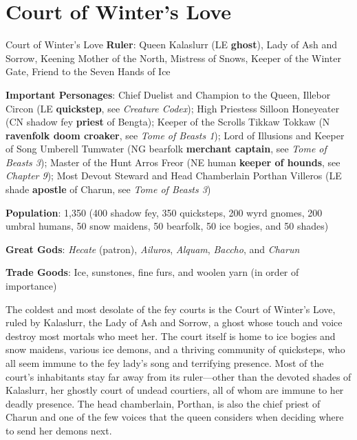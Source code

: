 \documentclass[10pt,a4paper,twoside,bg=print,twocolumn,openany,nodeprecatedcode]{dndbook}
\begin{document}
\section{Court of Winter's Love}
\begin{DndSidebar}[float=!b]{Court of Winter's Love}
\textbf{Ruler}: Queen Kalaslurr (LE \textbf{ghost}), Lady of Ash and Sorrow, Keening Mother of the North, Mistress of Snows, Keeper of the Winter Gate, Friend to the Seven Hands of Ice



\textbf{Important Personages}: Chief Duelist and Champion to the Queen, Illebor Circon (LE \textbf{quickstep}, see \textit{Creature Codex}); High Priestess Silloon Honeyeater (CN shadow fey \textbf{priest} of Bengta); Keeper of the Scrolls Tikkaw Tokkaw (N \textbf{ravenfolk doom croaker}, see \textit{Tome of Beasts 1}); Lord of Illusions and Keeper of Song Umberell Tumwater (NG bearfolk \textbf{merchant captain}, see \textit{Tome of Beasts 3}); Master of the Hunt Arros Freor (NE human \textbf{keeper of hounds}, see \textit{Chapter 9}); Most Devout Steward and Head Chamberlain Porthan Villeros (LE shade \textbf{apostle} of Charun, see \textit{Tome of Beasts 3})



\textbf{Population}: 1,350 (400 shadow fey, 350 quicksteps, 200 wyrd gnomes, 200 umbral humans, 50 snow maidens, 50 bearfolk, 50 ice bogies, and 50 shades)



\textbf{Great Gods}: \textit{Hecate} (patron), \textit{Ailuros}, \textit{Alquam}, \textit{Baccho}, and \textit{Charun}



\textbf{Trade Goods}: Ice, sunstones, fine furs, and woolen yarn (in order of importance)





\end{DndSidebar}

The coldest and most desolate of the fey courts is the Court of Winter's Love, ruled by Kalaslurr, the Lady of Ash and Sorrow, a ghost whose touch and voice destroy most mortals who meet her. The court itself is home to ice bogies and snow maidens, various ice demons, and a thriving community of quicksteps, who all seem immune to the fey lady's song and terrifying presence. Most of the court's inhabitants stay far away from its ruler—other than the devoted shades of Kalaslurr, her ghostly court of undead courtiers, all of whom are immune to her deadly presence. The head chamberlain, Porthan, is also the chief priest of Charun and one of the few voices that the queen considers when deciding where to send her demons next.
\end{document}
